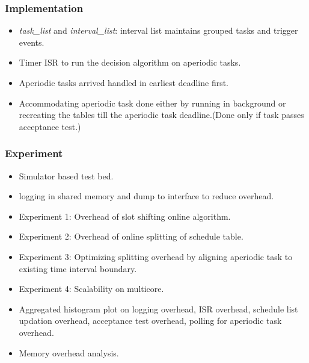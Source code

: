 \subsubsection*{Implementation}
\begin{itemize}
	\item \textit{task\_list} and \textit{interval\_list}: interval list maintains grouped tasks and trigger events.
	\item Timer ISR to run the decision algorithm on aperiodic tasks.
	\item Aperiodic tasks arrived handled in earliest deadline first.
	\item Accommodating aperiodic task done either by running in background or recreating the tables till the aperiodic task deadline.(Done only if task passes acceptance test.)	
\end{itemize}
\subsubsection*{Experiment}
\begin{itemize}
	\item Simulator based test bed.
	\item logging in shared memory and dump to interface to reduce overhead.
	\item Experiment 1: Overhead of slot shifting online algorithm.
	\item Experiment 2: Overhead of online splitting of schedule table.
	\item Experiment 3: Optimizing splitting overhead by aligning aperiodic task to existing time interval boundary.
	\item Experiment 4: Scalability on multicore.
	\item Aggregated histogram plot on logging overhead, ISR overhead, schedule list updation overhead, acceptance test overhead, polling for aperiodic task overhead.
	\item Memory overhead analysis.
\end{itemize}


